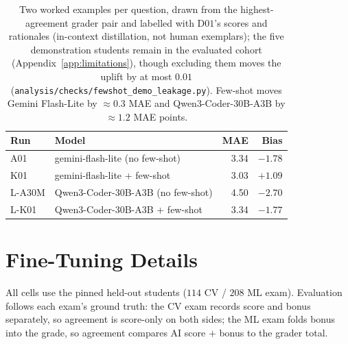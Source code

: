\begin{table}[h]
\centering
\caption{Two worked examples per question, drawn from the highest-agreement grader pair and labelled with D$01$'s scores and rationales (in-context distillation, not human exemplars); the five demonstration students remain in the evaluated cohort (Appendix~\ref{app:limitations}), though excluding them moves the uplift by at most $0.01$ (\texttt{analysis/checks/fewshot\_demo\_leakage.py}). Few-shot moves Gemini Flash-Lite by $\approx 0.3$ MAE and Qwen3-Coder-$30$B-A$3$B by $\approx 1.2$ MAE points.}
\label{tab:fewshot}
\small
\begin{tabular}{llrr}
\toprule
Run & Model & MAE & Bias \\
\midrule
A01 & gemini-flash-lite (no few-shot) & 3.34 & $-1.78$ \\
K01 & gemini-flash-lite + few-shot & 3.03 & $+1.09$ \\
L-A30M & Qwen3-Coder-30B-A3B (no few-shot) & 4.50 & $-2.70$ \\
L-K01 & Qwen3-Coder-30B-A3B + few-shot & 3.34 & $-1.77$ \\
\bottomrule
\end{tabular}
\end{table}

\clearpage
\section{Fine-Tuning Details}
\label{app:ft}

All cells use the pinned held-out students ($114$ CV / $208$ ML exam). Evaluation follows each exam's ground truth: the CV exam records score and bonus separately, so agreement is score-only on both sides; the ML exam folds bonus into the grade, so agreement compares AI score $+$ bonus to the grader total.


